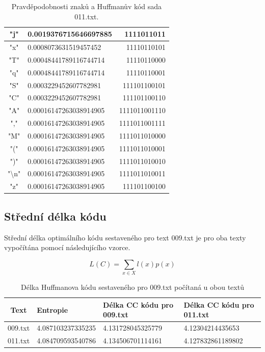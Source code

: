 \documentclass[12pt]{article}
\begin{document}
\begin{table}[!ht]
\begin{tabular}{ | c | l | r | }
"j"     &       0.0019376715646697885   &       1111011011      \\ \hline
"x"     &       0.0008073631519457452   &       11110110101     \\ \hline
"T"     &       0.00048441789116744714  &       11110110000     \\ \hline
"q"     &       0.00048441789116744714  &       11110110001     \\ \hline
"S"     &       0.0003229452607782981   &       111101100101    \\ \hline
"C"     &       0.0003229452607782981   &       111101100110    \\ \hline
"A"     &       0.00016147263038914905  &       1111011001110   \\ \hline
","     &       0.00016147263038914905  &       1111011001111   \\ \hline
"M"     &       0.00016147263038914905  &       1111011010000   \\ \hline
"("     &       0.00016147263038914905  &       1111011010001   \\ \hline
")"     &       0.00016147263038914905  &       1111011010010   \\ \hline
"\textbackslash n"      &       0.00016147263038914905  &       1111011010011   \\ \hline
"z"     &       0.00016147263038914905  &       111101100100    \\ \hline
\end{tabular}
\caption{Pravděpodobnosti znaků a Huffmanův kód sada 011.txt.}
\label{pzhk_011.txt_table}
\end{table}   		
 
			
   		\subsection{Střední délka kódu}\label{sdk}
			Střední délka optimálního kódu sestaveného pro text 009.txt je pro oba texty vypočítána pomocí následujícího vzorce.
			
			$$ L(C) = \sum_{x \displaystyle \in X} l(x) p(x)$$		
   		
\begin{table}[!ht]
\centering
\begin{tabular}{ | c | l | l | l | } \hline
Text	& Entropie & Délka CC kódu pro 009.txt & Délka CC kódu pro 011.txt \\ \hline
009.txt & 4.087103237335235 & 4.131728045325779 & 4.12304214435653 \\ \hline
011.txt & 4.084709593540786 & 4.134506701114161 & 4.127832861189802 \\ \hline
\end{tabular}
\caption{Délka Huffmanova kódu sestaveného pro 009.txt počítaná u obou textů}
\label{code_table}
\end{table}
\end{document}
